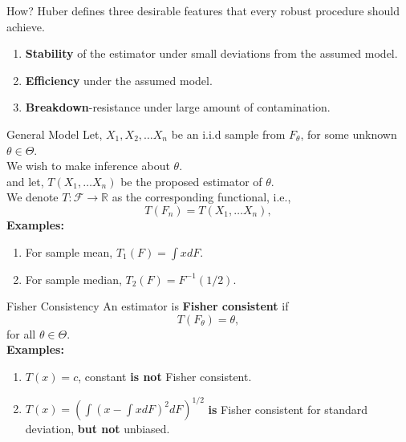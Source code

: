 \documentclass[10pt,xcolor=svgnames]{beamer} %
\newcommand{\R}{\mathbb{R}}
\begin{document}
\begin{frame}{How?}
    Huber defines three desirable features that every robust procedure should achieve. 
    \begin{enumerate}
        \item \textbf{Stability} of the estimator under small deviations from the assumed model.
        \pause
        \item \textbf{Efficiency} under the assumed model.
        \pause
        \item \textbf{Breakdown}-resistance under large amount of contamination.
    \end{enumerate}
\end{frame}

\begin{frame}{General Model}
    Let, $X_1, X_2, \dots X_n$ be an i.i.d sample from $F_{\theta}$, for some unknown $\theta \in \Theta$.\\
    We wish to make inference about $\theta$.\\
    and let, $T(X_1, \dots X_n)$ be the proposed estimator of $\theta$.\\
    We denote $T : \mathcal{F} \rightarrow \R$ as the corresponding functional, i.e.,
    \begin{equation*}
        T(F_n) = T(X_1, \dots X_n),
    \end{equation*}
    \pause
    \textbf{Examples:}
    \begin{enumerate}
        \item For sample mean, $T_1(F) = \int x dF$.
        \item For sample median, $T_2(F) = F^{-1}(1/2)$.
    \end{enumerate}
\end{frame}


\begin{frame}{Fisher Consistency}
    An estimator is \textbf{Fisher consistent} if 
    \begin{equation*}
        T(F_\theta) = \theta,
    \end{equation*}
    \noindent for all $\theta \in \Theta$.\\

    \pause 
    \textbf{Examples:}\\
    \begin{enumerate}
        \item $T(x) = c$, constant \textbf{is not} Fisher consistent.
        \item $T(x) = \left( \int (x - \int x dF)^2 dF \right)^{1/2}$ \textbf{is} Fisher consistent for standard deviation, \textbf{but not} unbiased.
    \end{enumerate}
\end{frame}
\end{document}
